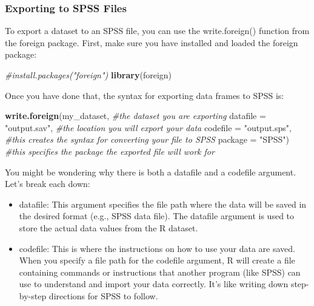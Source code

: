 \documentclass[
]{book}
\newenvironment{Shaded}{\begin{snugshade}}{\end{snugshade}}
\newcommand{\AttributeTok}[1]{\textcolor[rgb]{0.13,0.29,0.53}{#1}}
\newcommand{\CommentTok}[1]{\textcolor[rgb]{0.56,0.35,0.01}{\textit{#1}}}
\newcommand{\FunctionTok}[1]{\textcolor[rgb]{0.13,0.29,0.53}{\textbf{#1}}}
\newcommand{\NormalTok}[1]{#1}
\newcommand{\StringTok}[1]{\textcolor[rgb]{0.31,0.60,0.02}{#1}}
\begin{document}
\hypertarget{exporting-to-spss-files}{%
\subsubsection{Exporting to SPSS Files}\label{exporting-to-spss-files}}

To export a dataset to an SPSS file, you can use the write.foreign() function from the foreign package. First, make sure you have installed and loaded the foreign package:

\begin{Shaded}
\begin{Highlighting}[]
\CommentTok{\#install.packages("foreign")}
\FunctionTok{library}\NormalTok{(foreign)}
\end{Highlighting}
\end{Shaded}

Once you have done that, the syntax for exporting data frames to SPSS is:

\begin{Shaded}
\begin{Highlighting}[]
\FunctionTok{write.foreign}\NormalTok{(my\_dataset, }\CommentTok{\#the dataset you are exporting}
              \AttributeTok{datafile =} \StringTok{"output.sav"}\NormalTok{, }\CommentTok{\#the location you will export your data}
              \AttributeTok{codefile =} \StringTok{"output.sps"}\NormalTok{, }\CommentTok{\#this creates the syntax for converting your file to SPSS}
              \AttributeTok{package =} \StringTok{"SPSS"}\NormalTok{) }\CommentTok{\#this specifies the package the exported file will work for}
\end{Highlighting}
\end{Shaded}

You might be wondering why there is both a datafile and a codefile argument. Let's break each down:

\begin{itemize}
\item
  datafile: This argument specifies the file path where the data will be saved in the desired format (e.g., SPSS data file). The datafile argument is used to store the actual data values from the R dataset.
\item
  codefile: This is where the instructions on how to use your data are saved. When you specify a file path for the codefile argument, R will create a file containing commands or instructions that another program (like SPSS) can use to understand and import your data correctly. It's like writing down step-by-step directions for SPSS to follow.
\end{itemize}
\end{document}
